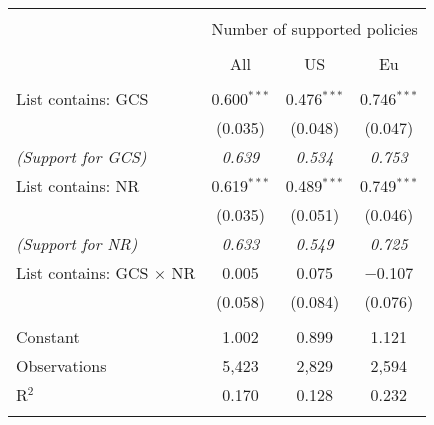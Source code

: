 
\begin{tabular}{@{\extracolsep{5pt}}lccc} 
\\[-1.8ex]\hline 
\hline \\[-1.8ex] 
 & \multicolumn{3}{c}{Number of supported policies} \\ 
\cline{2-4} 
\\[-1.8ex] & All & US & Eu \\ 
\hline \\[-1.8ex] 
 List contains: GCS & 0.600$^{***}$ & 0.476$^{***}$ & 0.746$^{***}$ \\ 
  & (0.035) & (0.048) & (0.047) \\ 
\textit{(Support for GCS)} & \textit{ 0.639 } & \textit{ 0.534 } & \textit{ 0.753 }\\
  List contains: NR & 0.619$^{***}$ & 0.489$^{***}$ & 0.749$^{***}$ \\ 
  & (0.035) & (0.051) & (0.046) \\ 
\textit{(Support for NR)} & \textit{ 0.633 } & \textit{ 0.549 } & \textit{ 0.725 }\\
  List contains: GCS $\times$ NR & 0.005 & 0.075 & $-$0.107 \\ 
  & (0.058) & (0.084) & (0.076) \\ 
 \hline \\[-1.8ex] 
Constant & 1.002 & 0.899 & 1.121 \\ 
Observations & 5,423 & 2,829 & 2,594 \\ 
R$^{2}$ & 0.170 & 0.128 & 0.232 \\ 
\hline 
\hline \\[-1.8ex] 
\end{tabular} 